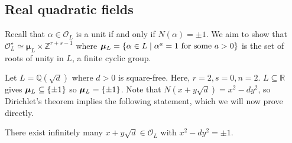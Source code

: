 \subsection{Real quadratic fields}
Recall that \( \alpha \in \mathcal O_L \) is a unit if and only if \( N(\alpha) = \pm 1 \).
We aim to show that \( \mathcal O_L^\star \simeq \bm \mu_L \times \mathbb Z^{r+s-1} \) where \( \bm \mu_L = \qty{\alpha \in L \mid \alpha^a = 1 \text{ for some } a > 0} \) is the set of roots of unity in \( L \), a finite cyclic group.
\begin{example}
    Let \( L = \mathbb Q(\sqrt{d}) \) where \( d > 0 \) is square-free.
    Here, \( r = 2, s = 0, n = 2 \).
    \( L \subseteq \mathbb R \) gives \( \bm \mu_L \subseteq \qty{\pm 1} \) so \( \bm \mu_L = \qty{\pm 1} \).
    Note that \( N(x+y\sqrt{d}) = x^2 - dy^2 \), so Dirichlet's theorem implies the following statement, which we will now prove directly.
\end{example}
\begin{theorem}
    There exist infinitely many \( x + y \sqrt{d} \in \mathcal O_L \) with \( x^2 - dy^2 = \pm 1 \).
\end{theorem}
